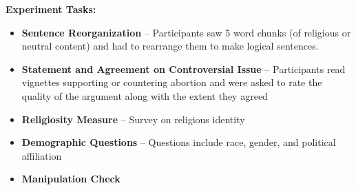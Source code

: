 \documentclass[landscape,a0paper,fontscale=0.285]{baposter} %
\newcommand{\compresslist}{ %
\setlength{\itemsep}{1pt}
\setlength{\parskip}{0pt}
\setlength{\parsep}{0pt}
}
\newcommand\tb{\textbf}
\begin{document}
\begin{poster}
{\tb{Experiment Tasks:}

\begin{itemize} \compresslist
	\item \tb{Sentence Reorganization} -- Participants saw 5 word chunks (of religious or neutral content) and had to rearrange them to make logical sentences.
	\item \tb{Statement and Agreement on Controversial Issue} -- Participants read vignettes supporting or countering abortion and were asked to rate the quality of the argument along with the extent they agreed
	\item \tb{Religiosity Measure} -- Survey on religious identity
	\item \tb{Demographic Questions} -- Questions include race, gender, and political affiliation 
	\item \tb{Manipulation Check}
\end{itemize}
}


\end{poster}
\end{document}
